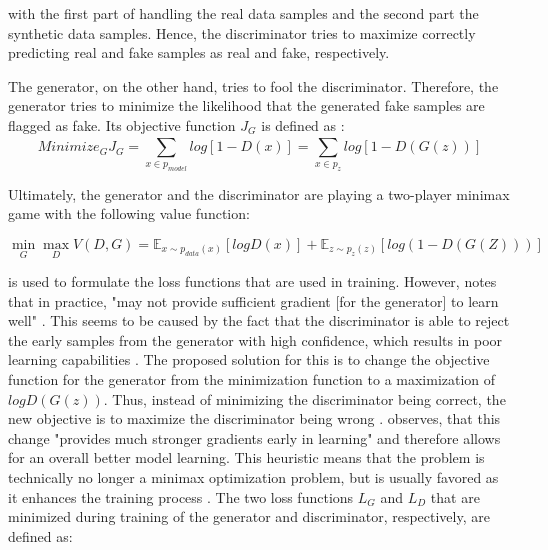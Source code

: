 with the first part of  handling the real data samples and the second part the synthetic data samples.
Hence, the discriminator tries to maximize correctly predicting real and fake samples as real and fake, respectively.

The generator, on the other hand, tries to fool the discriminator.
Therefore, the generator tries to minimize the likelihood that the generated fake samples are flagged as fake.
Its objective function $J_G$ is defined as \cite{aggarwal2018NeuralNetworksDeep}:
\begin{equation}
    \label{eqn:generator}
    Minimize_GJ_G= \sum_{x\in p_{model}}^{} log [1-D(x)] = \sum_{x\in p_z}^{} log [1-D(G(z))]
\end{equation}

\newpage %
Ultimately, the generator and the discriminator are playing a two-player minimax game with the following value function:

\begin{equation}
    \label{eqn:minimax}
    \min_G\max_DV(D,G)=\mathbb{E}_{x\sim p_{data}(x)} [log D(x)] + \mathbb{E}_{z\sim p_z(z)}[log( 1-D(G(Z)))]
\end{equation}

 is used to formulate the loss functions that are used in training.
However, \cite{NIPS2014_5ca3e9b1} notes that in practice,  "may not provide sufficient gradient [for the generator] to learn well" \cite[p. 3]{NIPS2014_5ca3e9b1}.
This seems to be caused by the fact that the discriminator is able to reject the early samples from the generator with high confidence, which results in poor learning capabilities \cite{NIPS2014_5ca3e9b1}.
The proposed solution for this is to change the objective function for the generator from the minimization function  to a maximization of $logD(G(z))$.
Thus, instead of minimizing the discriminator being correct, the new objective is to maximize the discriminator being wrong \cite{NIPS2014_5ca3e9b1}. 
\textcite[p. 3]{NIPS2014_5ca3e9b1} observes, that this change "provides much stronger gradients early in learning" and therefore allows for an overall better model learning.
This heuristic means that the problem is technically no longer a minimax optimization problem, but is usually favored as it enhances the training process \cite[p. 442]{aggarwal2018NeuralNetworksDeep}.
The two loss functions $L_G$ and $L_D$ that are minimized during training of the generator and discriminator, respectively, are defined as:

